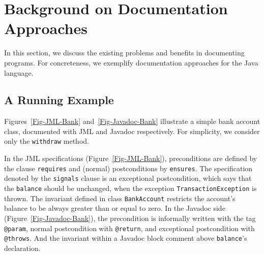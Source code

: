 \section{Background on Documentation Approaches}
\label{sec:example}

In this section, we discuss the existing problems and benefits in documenting programs. For concreteness,
we exemplify documentation approaches for the Java language.

\subsection{A Running Example}

Figures~\ref{Fig-JML-Bank} and~\ref{Fig-Javadoc-Bank} illustrate
a simple bank account class, documented with JML and Javadoc respectively. For simplicity, we consider only the {\lstinline!withdraw!} method.

In the JML specifications (Figure~\ref{Fig-JML-Bank}), preconditions
are defined by the clause {\lstinline!requires!} and (normal) postconditions by {\lstinline!ensures!}. The specification
denoted by the {\lstinline!signals!} clause
is an exceptional postcondition, which says that
the {\lstinline!balance!} should be unchanged, when the exception
\texttt{TransactionExcep\-tion} is thrown.
The invariant defined in class {\lstinline!BankAccount!} restricts the account's balance
to be always greater than or equal to zero.
In the Javadoc side (Figure~\ref{Fig-Javadoc-Bank}), the precondition is
informally written with the tag \lstinline!@param!, normal postcondition with
\lstinline!@return!, and exceptional postcondition with \lstinline!@throws!.
And the invariant within a Javadoc block comment
above \lstinline!balance!'s declaration.

